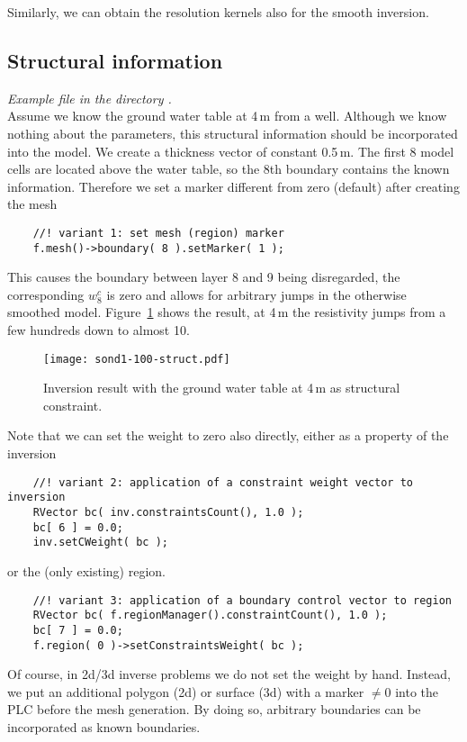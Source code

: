 Similarly, we can obtain the resolution kernels also for the smooth inversion.

\subsection{Structural information}\label{sec:dc1dstruct}
{\em Example file  in the directory .}\\
Assume we know the ground water table at 4\,m from a well.
Although we know nothing about the parameters, this structural information should be incorporated into the model.
We create a thickness vector of constant 0.5\,m. 
The first 8 model cells are located above the water table, so the 8th boundary contains the known information.
Therefore we set a marker different from zero (default) after creating the mesh
\begin{lstlisting}
    //! variant 1: set mesh (region) marker
    f.mesh()->boundary( 8 ).setMarker( 1 );
\end{lstlisting}
This causes the boundary between layer 8 and 9 being disregarded, the corresponding $w^c_8$ is zero and allows for arbitrary jumps in the otherwise smoothed model.
Figure~\ref{fig:dc1dsmooth-struct} shows the result, at 4\,m the resistivity jumps from a few hundreds down to almost 10.

\begin{figure}[htbp]
\centering\texttt{[image: sond1-100-struct.pdf]}
\caption{Inversion result with the ground water table at 4\,m as structural constraint.}\label{fig:dc1dsmooth-struct}
\end{figure}

Note that we can set the weight to zero also directly, either as a property of the inversion
\begin{lstlisting}
    //! variant 2: application of a constraint weight vector to inversion
    RVector bc( inv.constraintsCount(), 1.0 );
    bc[ 6 ] = 0.0;
    inv.setCWeight( bc ); 
\end{lstlisting}
or the (only existing) region.
\begin{lstlisting}
    //! variant 3: application of a boundary control vector to region
    RVector bc( f.regionManager().constraintCount(), 1.0 );
    bc[ 7 ] = 0.0;
    f.region( 0 )->setConstraintsWeight( bc );
\end{lstlisting}
Of course, in 2d/3d inverse problems we do not set the weight by hand.
Instead, we put an additional polygon (2d) or surface (3d) with a marker $\neq 0$ into the PLC before the mesh generation.
By doing so, arbitrary boundaries can be incorporated as known boundaries.

